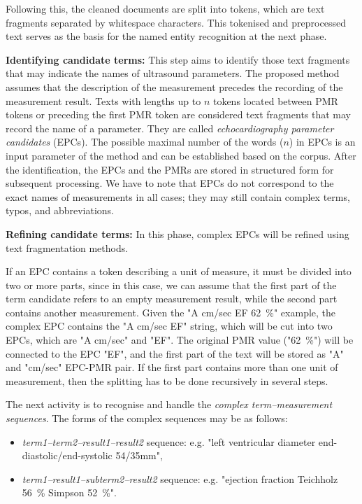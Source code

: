 Following this, the cleaned documents are split into tokens, which are text fragments separated by whitespace characters. This tokenised and preprocessed text serves as the basis for the named entity recognition at the next phase.

\textbf{Identifying candidate terms:} This step aims to identify those text fragments that may indicate the names of ultrasound parameters. The proposed method assumes that the description of the measurement precedes the recording of the measurement result. Texts with lengths up to $n$ tokens located between PMR tokens or preceding the first PMR token are considered text fragments that may record the name of a parameter. They are called \textit{echocardiography parameter candidates} (EPCs). The possible maximal number of the words ($n$) in EPCs is an input parameter of the method and can be established based on the corpus. After the identification, the EPCs and the PMRs are stored in structured form for subsequent processing. We have to note that EPCs do not correspond to the exact names of measurements in all cases; they may still contain complex terms, typos, and abbreviations. 

\textbf{Refining candidate terms:} In this phase, complex EPCs will be refined using text fragmentation methods. 

If an EPC contains a token describing a unit of measure, it must be divided into two or more parts, since in this case, we can assume that the first part of the term candidate refers to an empty measurement result, while the second part contains another measurement. Given the "A cm/sec EF \SI{62}{\percent}" example, the complex EPC contains the "A cm/sec EF" string, which will be cut into two EPCs, which are "A cm/sec" and "EF". The original PMR value ("\SI{62}{\percent}") will be connected to the EPC "EF", and the first part of the text will be stored as "A" and "cm/sec" EPC-PMR pair. If the first part contains more than one unit of measurement, then the splitting has to be done recursively in several steps.

The next activity is to recognise and handle the \textit{complex term–measurement sequences}. The forms of the complex sequences may be as follows:

\begin{itemize}
	\item \textit{term1–term2–result1–result2} sequence: e.g. "left ventricular diameter end-diastolic/end-systolic 54/35mm",
	\item \textit{term1–result1–subterm2–result2} sequence: e.g. "ejection fraction Teichholz \SI{56}{\percent} Simpson \SI{52}{\percent}".
\end{itemize}


